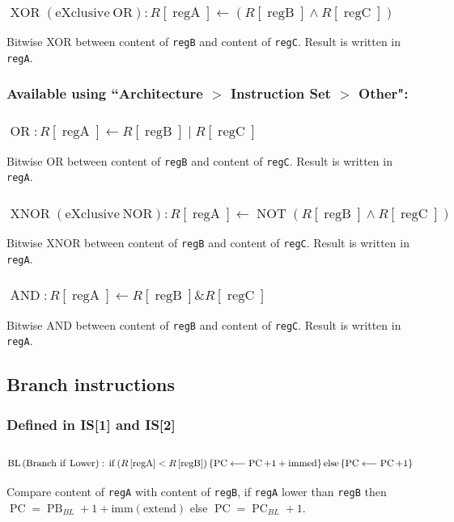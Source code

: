 \documentclass[10pt,a4paper]{article}
\theoremstyle{definition}%
\newcommand{\on}[1]{\operatorname{#1}}
\newcommand{\reg}[1]{\texttt{reg#1}}
\begin{document}
\subsubsection{$\on{XOR} \on{(eXclusive~ OR)}: R\left[ \on{regA} \right] \longleftarrow   \left( R\left[ \on{regB} \right] \wedge R\left[ \on{regC} \right]\right) $}
Bitwise XOR between content of \reg{B} and content of \reg{C}. Result is written in \reg{A}.


\subsubsection*{ Available using ``Architecture $>$ Instruction Set $>$ Other":}

\subsubsection{$\on{OR}: R\left[ \on{regA} \right] \longleftarrow    R\left[ \on{regB} \right] \mid R\left[ \on{regC} \right] $}
Bitwise OR between content of \reg{B} and content of \reg{C}. Result is written in \reg{A}.

\subsubsection{$\on{XNOR} \on{(eXclusive~ NOR)}: R\left[ \on{regA} \right] \longleftarrow  \on{NOT} \left( R\left[ \on{regB} \right] \wedge R\left[ \on{regC} \right]\right) $}
Bitwise XNOR between content of \reg{B} and content of \reg{C}. Result is written in \reg{A}.

\subsubsection{$\on{AND}: R\left[ \on{regA} \right] \longleftarrow    R\left[ \on{regB} \right] \& R\left[ \on{regC} \right] $}
Bitwise AND between content of \reg{B} and content of \reg{C}. Result is written in \reg{A}.

\subsection{Branch instructions}
\subsubsection*{ Defined in IS[1] and IS[2]}
\subsubsection{$\on{BL} \on{(Branch~if~Lower)}:\newline \on{if} \left( R\left[ \on{regA} \right] < R\left[ \on{regB} \right]\right) \left\lbrace\on{PC} \longleftarrow \on{PC}+1+\on{immed} \right\rbrace\on{else} \left\lbrace\on{PC} \longleftarrow \on{PC}+1\right\rbrace $}
Compare content of \reg{A} with content of \reg{B}, if \reg{A} lower than \reg{B} then\\$\on{PC}=\on{PB}_{BL}+1+\on{imm(extend)}$ else $\on{PC}=\on{PC}_{BL}+1$.
\end{document}
